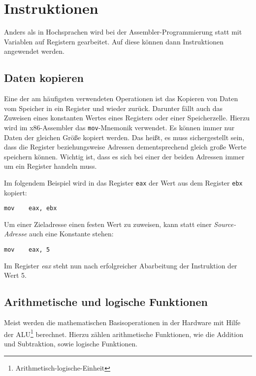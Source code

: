 \section{Instruktionen}

Anders als in Hochsprachen wird bei der Assembler-Programmierung statt mit Variablen auf Registern gearbeitet. Auf diese können dann Instruktionen angewendet werden.

\subsection{Daten kopieren}
Eine der am häufigsten verwendeten Operationen ist das Kopieren von Daten vom Speicher in ein Register und wieder zurück.
Darunter fällt auch das Zuweisen eines konstanten Wertes eines Registers oder einer Speicherzelle.
Hierzu wird im x86-Assembler das \texttt{mov}-Mnemonik verwendet.
Es können immer nur Daten der gleichen Größe kopiert werden.
Das heißt, es muss sichergestellt sein, dass die Register beziehungsweise Adressen dementsprechend gleich große Werte speichern können.
Wichtig ist, dass es sich bei einer der beiden Adressen immer um ein Register handeln muss.

Im folgendem Beispiel wird in das Register \texttt{eax} der Wert aus dem Register \texttt{ebx} kopiert:

\begin{lstlisting}
mov    eax, ebx
\end{lstlisting}

Um einer Zieladresse einen festen Wert zu zuweisen, kann statt einer \textit{Source-Adresse} auch eine Konstante stehen:

\begin{lstlisting}
mov    eax, 5
\end{lstlisting}

Im Register \textit{eax} steht nun nach erfolgreicher Abarbeitung der Instruktion der Wert 5.


\subsection{Arithmetische und logische Funktionen}
Meist werden die mathematischen Basisoperationen in der Hardware mit Hilfe der ALU\footnote{Arithmetisch-logische-Einheit} berechnet.
Hierzu zählen arithmetische Funktionen, wie die Addition und Subtraktion, sowie logische Funktionen.

